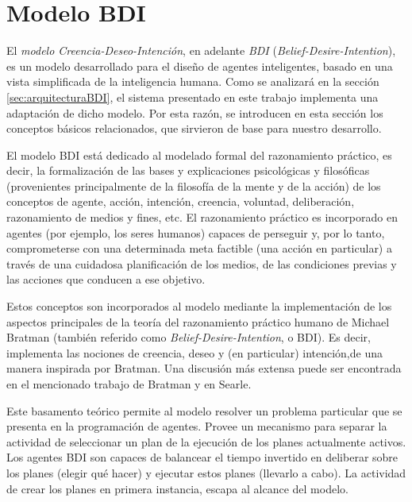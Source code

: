 \section{Modelo BDI}

\label{sec:preliminaresBDI}

El \textit{modelo Creencia-Deseo-Intención}\cite{Rao:1991}, en adelante \textit{BDI} 
(\textit{Belief-Desire-Inten\-tion}),
es un modelo desarrollado para el diseño de agentes inteligentes, basado en una
vista simplificada de la inteligencia humana. Como se analizará en la sección 
\ref{sec:arquitecturaBDI}, el sistema presentado en este trabajo implementa una 
adaptación de dicho modelo. Por esta razón, se introducen en esta sección los 
conceptos básicos relacionados, que sirvieron de base para nuestro desarrollo.

El modelo BDI está dedicado al modelado formal del razonamiento práctico, es 
decir, la formalización de las bases y explicaciones psicológicas y filosóficas 
(provenientes principalmente de la filosofía de la mente y de la acción) de los 
conceptos de agente, acción, intención, creencia, voluntad, deliberación, 
razonamiento de medios y fines, etc. El razonamiento práctico es incorporado 
en agentes (por ejemplo, los seres humanos) capaces de perseguir y, por lo tanto, 
comprometerse con una determinada meta factible (una acción en particular) 
a través de una cuidadosa planificación de los medios, de las condiciones previas 
y las acciones que conducen a ese objetivo. 

Estos conceptos son incorporados al modelo mediante la implementación de los 
aspectos principales de la teoría del razonamiento práctico humano de Michael Bratman \cite{citeulike:2063638}
(también referido como \textit{Belief-Desire-Intention}, o BDI). Es decir, implementa 
las nociones de creencia, deseo y (en particular) intención,de una manera inspirada 
por Bratman. Una discusión más extensa puede ser encontrada en el mencionado 
trabajo de Bratman y en Searle\cite{searle:1985}.

Este basamento teórico permite al modelo resolver un problema particular que 
se presenta en la programación de agentes. Provee un mecanismo para separar la 
actividad de seleccionar un plan de la ejecución de los planes actualmente activos.
Los agentes BDI son capaces de balancear el tiempo invertido en deliberar sobre los
planes (elegir qué hacer) y ejecutar estos planes (llevarlo a cabo). La actividad 
de crear los planes en primera instancia, escapa al alcance del modelo.

